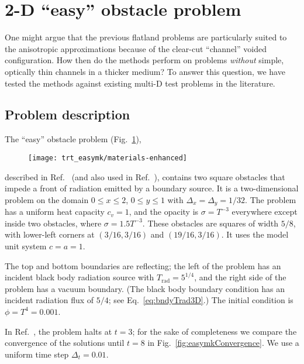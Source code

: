 
\clearpage
\section{2-D \texorpdfstring{``easy''}{easy} obstacle problem}

One might argue that the previous flatland problems are particularly suited to
the
anisotropic approximations because of the clear-cut ``channel'' voided
configuration. How then do the methods perform on problems
\emph{without} simple, optically thin channels in a thicker medium? To answer this
question, we have tested the methods against existing multi-D test problems in
the literature.

\subsection{Problem description}

The ``easy'' obstacle problem (Fig.~\ref{fig:easymkMaterials}),
%
\begin{figure}[htb]
  \centering
  \texttt{[image: trt\_easymk/materials-enhanced]}
  \label{fig:easymkMaterials}
\end{figure}
%
described in Ref.~\cite{Mou2006} (and also used in
Ref.~\cite{Kno2007}), contains two square obstacles that impede a front of
radiation emitted by a boundary source. It is a
two-dimensional problem on the domain $0 \le x \le 2$, $0 \le y \le 1$ with
$\Delta_x=\Delta_y=1/32$. The
problem has a uniform heat capacity $c_v = 1$, and the opacity is
$\sigma=T^{-3}$ everywhere except inside two obstacles, where $\sigma= 1.5
T^{-3}$. These obstacles are squares of width $5/8$, with lower-left corners
at $(3/16, 3/16)$ and $(19/16, 3/16)$. It uses the model unit system $c=a=1$.

The top and bottom boundaries are reflecting; the left of the problem has an
incident black body radiation source with $T_\text{rad} = 5^{1/4}$, and the right
side of the problem has a vacuum boundary. (The black body boundary condition
has an incident radiation flux of $5/4$; see Eq.~\eqref{eq:bndyTrad3D}.) The
initial condition is $\phi = T^{4} = 0.001$.

In Ref.~\cite{Mou2006}, the problem halts at $t=3$; for the sake of completeness we
compare the convergence of the solutions until $t=8$ in
Fig.~\ref{fig:easymkConvergence}. We use a uniform time step $\Delta_t=0.01$.

